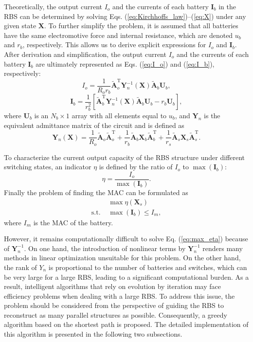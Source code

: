 \documentclass{article}
\def\T{\mathrm{T}}
\begin{document}
Theoretically, the output current $I_o$ and the currents of each battery $\bm{I}_b$ in the RBS  can be determined by solving Eqs. (\ref{eq:Kirchhoffs_law})--(\ref{eq:X}) under any given state $\bm{X}$.
To further simplify the problem, it is assumed that all batteries have the same electromotive force and internal resistance, which are denoted $u_b$ and $r_b$, respectively.
This allows us to derive explicit expressions for $I_o$ and $\bm{I}_b$.
After derivation and simplification, the output current $I_o$ and the currents of each battery $\bm{I}_b$ are ultimately represented as Eqs. (\ref{eq:I_o}) and (\ref{eq:I_b}), respectively:
\begin{equation}\label{eq:I_o}
    I_o = \frac{1}{R_o r_b} \bm{\tilde{A}}_o^\T \bm{Y}_n^{-1}(\bm{X}) \bm{\tilde{A}}_b \bm{U}_b,
\end{equation}
\begin{equation}\label{eq:I_b}
    \bm{I}_b = \frac{1}{r_b^2}[\bm{\tilde{A}}_b^\T \bm{Y}_n^{-1}(\bm{X}) \bm{\tilde{A}}_b\bm{U}_b -r_b \bm{U}_b],
\end{equation}
where $\bm{U}_b$ is an $N_b\times 1$ array with all elements equal to $u_b$,
and $\bm{Y}_n$ is the equivalent admittance matrix of the circuit and is defined as
\begin{equation}\label{eq:Yn}
    \bm{Y}_n (\bm{X}) = \frac{1}{R_o} \bm{\tilde{A}}_o\bm{\tilde{A}}_o^\T + \frac{1}{r_b} \bm{\tilde{A}}_b\bm{X}_b\bm{\tilde{A}}_b^\T + \frac{1}{r_s}\bm{\tilde{A}}_s\bm{X}_s\bm{\tilde{A}}_s^\T.
\end{equation}


To characterize the current output capacity of the RBS structure under different switching states, an indicator $\eta$ is defined by the ratio of $I_o$ to $\max (\bm{I}_b)$:
\begin{equation}\label{eq:eta}
    \eta = \frac{I_o}{\max (\bm{I}_b)}.
\end{equation}
Finally the problem of finding the MAC can be formulated as
\begin{align}
    & \max \eta(\bm{X}_s) \label{eq:max_eta}\\
    \text{s.t. } & \max (\bm{I}_b) \leq I_m, \label{eq:Ib_leq_Im}
\end{align}
where $I_m$ is the MAC of the battery.


However, it remains computationally difficult to solve Eq. (\ref{eq:max_eta}) because of $\bm{Y}_n^{-1}$.
On one hand,  the introduction of nonlinear terms by $\bm{Y}_n^{-1}$ renders many  methods in linear optimization unsuitable for this problem.
On the other hand, the rank of $Y_{n}$ is proportional to the number of batteries and switches, which can be very large for a large RBS, leading to a significant computational burden.
As a result, intelligent algorithms that rely on evolution by iteration may face efficiency problems when dealing with a large RBS.
To address this issue, the problem should be considered from the perspective of guiding the RBS to reconstruct as many parallel structures as possible.
Consequently, a greedy algorithm based on the shortest path is proposed. 
The detailed implementation of this algorithm is presented in the following two subsections.
\end{document}
